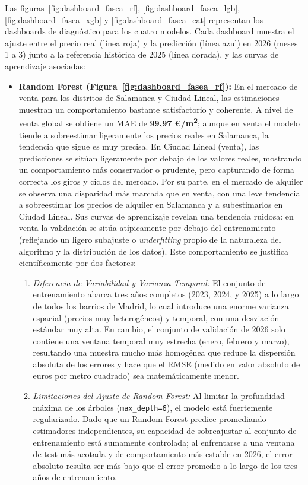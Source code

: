 \documentclass[a4paper,11pt,openany]{book}
\begin{document}
Las figuras~\ref{fig:dashboard_fasea_rf}, \ref{fig:dashboard_fasea_lgb}, \ref{fig:dashboard_fasea_xgb} y \ref{fig:dashboard_fasea_cat} representan los dashboards de diagnóstico para los cuatro modelos. Cada dashboard muestra el ajuste entre el precio real (línea roja) y la predicción (línea azul) en 2026 (meses 1 a 3) junto a la referencia histórica de 2025 (línea dorada), y las curvas de aprendizaje asociadas:
\begin{itemize}
    \item \textbf{Random Forest (Figura~\ref{fig:dashboard_fasea_rf}):} En el mercado de venta para los distritos de Salamanca y Ciudad Lineal, las estimaciones muestran un comportamiento bastante satisfactorio y coherente. A nivel de venta global se obtiene un MAE de \textbf{99,97 €/m\textsuperscript{2}}; aunque en venta el modelo tiende a sobreestimar ligeramente los precios reales en Salamanca, la tendencia que sigue es muy precisa. En Ciudad Lineal (venta), las predicciones se sitúan ligeramente por debajo de los valores reales, mostrando un comportamiento más conservador o prudente, pero capturando de forma correcta los giros y ciclos del mercado. Por su parte, en el mercado de alquiler se observa una disparidad más marcada que en venta, con una leve tendencia a sobreestimar los precios de alquiler en Salamanca y a subestimarlos en Ciudad Lineal. Sus curvas de aprendizaje revelan una tendencia ruidosa: en venta la validación se sitúa atípicamente por debajo del entrenamiento (reflejando un ligero subajuste o \textit{underfitting} propio de la naturaleza del algoritmo y la distribución de los datos). Este comportamiento se justifica científicamente por dos factores:
    \begin{enumerate}
        \item \textit{Diferencia de Variabilidad y Varianza Temporal:} El conjunto de entrenamiento abarca tres años completos (2023, 2024, y 2025) a lo largo de todos los barrios de Madrid, lo cual introduce una enorme varianza espacial (precios muy heterogéneos) y temporal, con una desviación estándar muy alta. En cambio, el conjunto de validación de 2026 solo contiene una ventana temporal muy estrecha (enero, febrero y marzo), resultando una muestra mucho más homogénea que reduce la dispersión absoluta de los errores y hace que el RMSE (medido en valor absoluto de euros por metro cuadrado) sea matemáticamente menor.
        \item \textit{Limitaciones del Ajuste de Random Forest:} Al limitar la profundidad máxima de los árboles (\texttt{max\_depth=6}), el modelo está fuertemente regularizado. Dado que un Random Forest predice promediando estimadores independientes, su capacidad de sobreajustar al conjunto de entrenamiento está sumamente controlada; al enfrentarse a una ventana de test más acotada y de comportamiento más estable en 2026, el error absoluto resulta ser más bajo que el error promedio a lo largo de los tres años de entrenamiento.

\end{enumerate}
\end{itemize}
\end{document}
